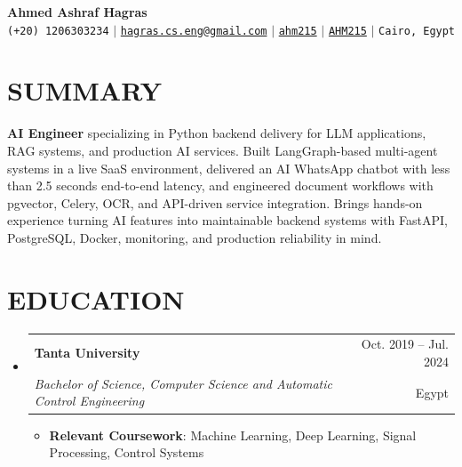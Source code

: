 \documentclass[letterpaper,11pt]{article}
\makeatletter
\newcommand{\resumeItem}[1]{
  \item\small{
    {#1 \vspace{-1pt}}
  }
}
\newcommand{\resumeSubheading}[4]{
  \vspace{-1pt}\item
    \begin{tabular*}{\textwidth}[t]{l@{\extracolsep{\fill}}r}
      \textbf{#1} & {\color{dark-grey}\small #2}\vspace{1pt}\\
      \textit{#3} & {\color{dark-grey} \small #4}\\
    \end{tabular*}\vspace{-4pt}
}
\newcommand{\resumeSubHeadingListStart}{\begin{itemize}[leftmargin=0in, label={}]}
\newcommand{\resumeSubHeadingListEnd}{\end{itemize}}
\newcommand{\resumeItemListStart}{\begin{itemize}}
\newcommand{\resumeItemListEnd}{\end{itemize}\vspace{0pt}}
\makeatother
\begin{document}
\begin{center}
    \textbf{\Huge Ahmed Ashraf Hagras} \\ \vspace{5pt}
    \small \faPhone* \texttt{(+20) 1206303234} \hspace{1pt} $|$
    \hspace{1pt} \faEnvelope \hspace{2pt} \href{mailto:hagras.cs.eng@gmail.com}{\texttt{hagras.cs.eng@gmail.com}} \hspace{1pt} $|$
    \hspace{1pt} \faLinkedin \hspace{2pt} \href{https://www.linkedin.com/in/ahm215}{\texttt{ahm215}} \hspace{1pt} $|$
    \hspace{1pt} \faGithub \hspace{2pt} \href{https://github.com/AHM215}{\texttt{AHM215}} \hspace{1pt} $|$
    \hspace{1pt} \faMapMarker* \hspace{2pt}\texttt{Cairo, Egypt}
    \\ \vspace{-3pt}
\end{center}

\section{SUMMARY}
\small{
\textbf{AI Engineer} specializing in Python backend delivery for LLM applications, RAG systems, and production AI services. Built LangGraph-based multi-agent systems in a live SaaS environment, delivered an AI WhatsApp chatbot with less than 2.5 seconds end-to-end latency, and engineered document workflows with pgvector, Celery, OCR, and API-driven service integration. Brings hands-on experience turning AI features into maintainable backend systems with FastAPI, PostgreSQL, Docker, monitoring, and production reliability in mind.
}

\section{EDUCATION}
  \resumeSubHeadingListStart
    \resumeSubheading
      {Tanta University}{Oct. 2019 -- Jul. 2024}
      {Bachelor of Science, Computer Science and Automatic Control Engineering}{Egypt}
      \resumeItemListStart
        \resumeItem{\textbf{Relevant Coursework}: Machine Learning, Deep Learning, Signal Processing, Control Systems}
      \resumeItemListEnd
  \resumeSubHeadingListEnd
\end{document}
